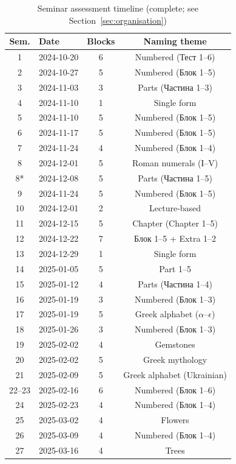 \begin{table}[!h]
\centering
\caption{Seminar assessment timeline (complete; see Section~\ref{sec:organisation})}
\label{tab:full-timeline}
\small
\begin{tabular}{clcc}
\hline
\textbf{Sem.} & \textbf{Date} & \textbf{Blocks} & \textbf{Naming theme} \\
\hline
1 & 2024-10-20 & 6 & Numbered (Тест 1--6) \\
2 & 2024-10-27 & 5 & Numbered (Блок 1--5) \\
3 & 2024-11-03 & 3 & Parts (Частина 1--3) \\
4 & 2024-11-10 & 1 & Single form \\
5 & 2024-11-10 & 5 & Numbered (Блок 1--5) \\
6 & 2024-11-17 & 5 & Numbered (Блок 1--5) \\
7 & 2024-11-24 & 4 & Numbered (Блок 1--4) \\
8 & 2024-12-01 & 5 & Roman numerals (І--V) \\
8* & 2024-12-08 & 5 & Parts (Частина 1--5) \\
9 & 2024-11-24 & 5 & Numbered (Блок 1--5) \\
10 & 2024-12-01 & 2 & Lecture-based \\
11 & 2024-12-15 & 5 & Chapter (Chapter 1--5) \\
12 & 2024-12-22 & 7 & Блок 1--5 + Extra 1--2 \\
13 & 2024-12-29 & 1 & Single form \\
14 & 2025-01-05 & 5 & Part 1--5 \\
15 & 2025-01-12 & 4 & Parts (Частина 1--4) \\
16 & 2025-01-19 & 3 & Numbered (Блок 1--3) \\
17 & 2025-01-19 & 5 & Greek alphabet ($\alpha$--$\epsilon$) \\
18 & 2025-01-26 & 3 & Numbered (Блок 1--3) \\
19 & 2025-02-02 & 4 & Gemstones \\
20 & 2025-02-02 & 5 & Greek mythology \\
21 & 2025-02-09 & 5 & Greek alphabet (Ukrainian) \\
22--23 & 2025-02-16 & 6 & Numbered (Блок 1--6) \\
24 & 2025-02-23 & 4 & Numbered (Блок 1--4) \\
25 & 2025-03-02 & 4 & Flowers \\
26 & 2025-03-09 & 4 & Numbered (Блок 1--4) \\
27 & 2025-03-16 & 4 & Trees \\

\end{tabular}
\end{table}
